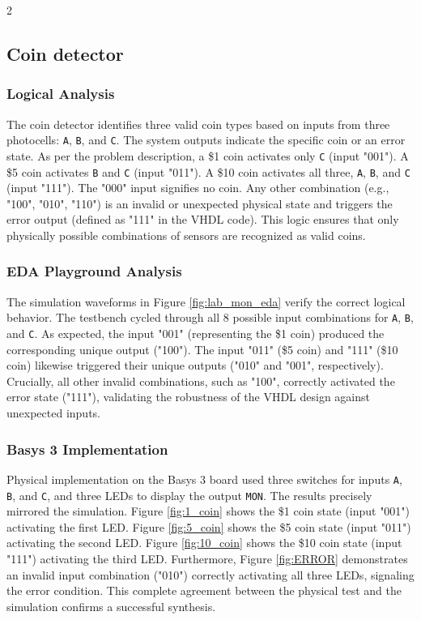 \documentclass{article}
\begin{document}
\begin{multicols}{2}
\subsection{Coin detector}
\subsubsection{Logical Analysis}
The coin detector identifies three valid coin types based on inputs from three photocells: \texttt{A}, \texttt{B}, and \texttt{C}. The system outputs indicate the specific coin or an error state. As per the problem description, a \$1 coin activates only \texttt{C} (input "001"). A \$5 coin activates \texttt{B} and \texttt{C} (input "011"). A \$10 coin activates all three, \texttt{A}, \texttt{B}, and \texttt{C} (input "111"). The "000" input signifies no coin. Any other combination (e.g., "100", "010", "110") is an invalid or unexpected physical state and triggers the error output (defined as "111" in the VHDL code). This logic ensures that only physically possible combinations of sensors are recognized as valid coins.

\subsubsection{EDA Playground Analysis}
The simulation waveforms in Figure \ref{fig:lab_mon_eda} verify the correct logical behavior. The testbench cycled through all 8 possible input combinations for \texttt{A}, \texttt{B}, and \texttt{C}. As expected, the input "001" (representing the \$1 coin) produced the corresponding unique output ("100"). The input "011" (\$5 coin) and "111" (\$10 coin) likewise triggered their unique outputs ("010" and "001", respectively). Crucially, all other invalid combinations, such as "100", correctly activated the error state ("111"), validating the robustness of the VHDL design against unexpected inputs.

\subsubsection{Basys 3 Implementation}
Physical implementation on the Basys 3 board used three switches for inputs \texttt{A}, \texttt{B}, and \texttt{C}, and three LEDs to display the output \texttt{MON}. The results precisely mirrored the simulation. Figure \ref{fig:1_coin} shows the \$1 coin state (input "001") activating the first LED. Figure \ref{fig:5_coin} shows the \$5 coin state (input "011") activating the second LED. Figure \ref{fig:10_coin} shows the \$10 coin state (input "111") activating the third LED. Furthermore, Figure \ref{fig:ERROR} demonstrates an invalid input combination ("010") correctly activating all three LEDs, signaling the error condition. This complete agreement between the physical test and the simulation confirms a successful synthesis.


\end{multicols}
\end{document}
